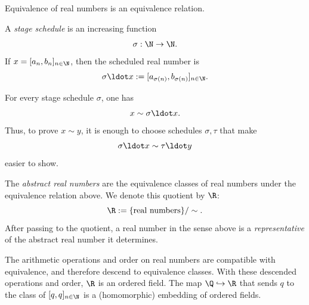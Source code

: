 \begin{proposition}\label{prop:raw-equiv-relation}
Equivalence of real numbers is an equivalence relation.
\end{proposition}

\begin{definition}\label{def:stage-schedule}
A \emph{stage schedule} is an increasing function
\[
  \sigma:\N\to\N.
\]
If \(x=[a_n,b_n]_{n\in\N}\), then the scheduled real number is
\[
  \sigma\ldot x:=[a_{\sigma(n)},b_{\sigma(n)}]_{n\in\N}.
\]
\end{definition}

\begin{proposition}\label{prop:stage-schedule-equiv}
For every stage schedule \(\sigma\), one has
\[
  x\sim \sigma\ldot x.
\]
Thus, to prove \(x\sim y\), it is enough to choose schedules
\(\sigma,\tau\) that make
\[
  \sigma\ldot x\sim \tau\ldot y
\]
easier to show.
\end{proposition}

\begin{definition}\label{def:reals-quotient}
The \emph{abstract real numbers} are the equivalence classes of real numbers
under the equivalence relation above.  We denote this quotient by \(\R\):
\[
  \R:=\{\text{real numbers}\}/\sim.
\]
After passing to the quotient, a real number in the sense above is a
\emph{representative} of the abstract real number it determines.
\end{definition}

\begin{theorem}\label{thm:raw-reals-field}
The arithmetic operations and order on real numbers are compatible with
equivalence, and therefore descend to equivalence classes.  With these
descended operations and order, \(\R\) is an ordered field.
The map \(\Q\hookrightarrow\R\) that sends \(q\) to the class of
\( [q,q]_{n\in\N} \)
is a (homomorphic) embedding of ordered fields.
\end{theorem}

